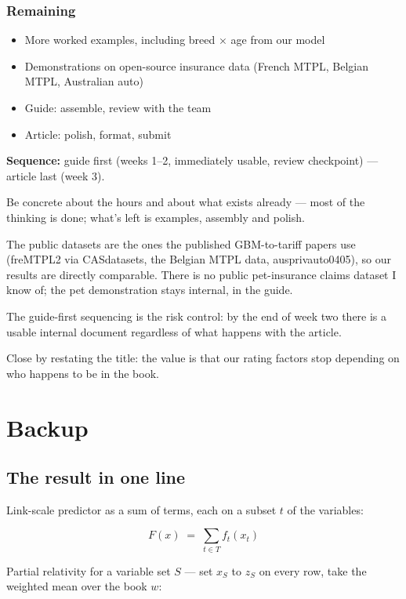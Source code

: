 \documentclass[
  letterpaper,
  DIV=11,
  numbers=noendperiod]{scrartcl}
\providecommand{\tightlist}{%
  \setlength{\itemsep}{0pt}\setlength{\parskip}{0pt}}
\begin{document}
\subsubsection{Remaining}\label{remaining}

\begin{itemize}
\tightlist
\item
  More worked examples, including breed \(\times\) age from our model
\item
  Demonstrations on open-source insurance data (French MTPL, Belgian
  MTPL, Australian auto)
\item
  Guide: assemble, review with the team
\item
  Article: polish, format, submit
\end{itemize}

\textbf{Sequence:} guide first (weeks 1--2, immediately usable, review
checkpoint) --- article last (week 3).

Be concrete about the hours and about what exists already --- most of
the thinking is done; what's left is examples, assembly and polish.

The public datasets are the ones the published GBM-to-tariff papers use
(freMTPL2 via CASdatasets, the Belgian MTPL data, ausprivauto0405), so
our results are directly comparable. There is no public pet-insurance
claims dataset I know of; the pet demonstration stays internal, in the
guide.

The guide-first sequencing is the risk control: by the end of week two
there is a usable internal document regardless of what happens with the
article.

Close by restating the title: the value is that our rating factors stop
depending on who happens to be in the book.

\section*{Backup}\label{backup}

\subsection{The result in one line}\label{theorem}

Link-scale predictor as a sum of terms, each on a subset \(t\) of the
variables:

\[
F(x) \;=\; \sum_{t \in T} f_t(x_t)
\]

Partial relativity for a variable set \(S\) --- set \(x_S\) to \(z_S\)
on every row, take the weighted mean over the book \(w\):
\end{document}
